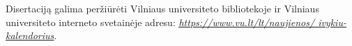 \vspace{1cm}
\noindent
Disertaciją galima peržiūrėti Vilniaus universiteto bibliotekoje ir Vilniaus universiteto interneto svetainėje adresu: 
\href{https://www.vu.lt/lt/naujienos/ivykiu-kalendorius}{ \textit{\underline{https://www.vu.lt/lt/naujienos/} \underline{ivykiu-kalendorius}}}. 

